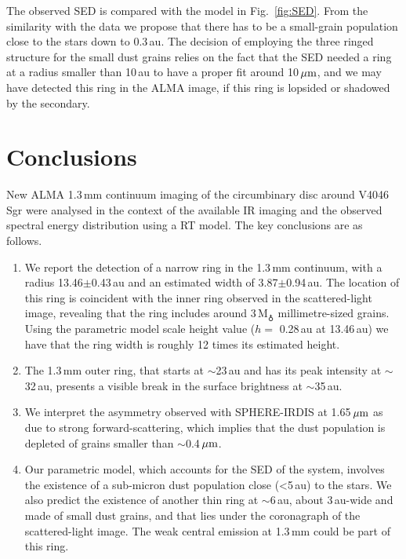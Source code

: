 \documentclass[letters,usenatbib,times]{mnras}
\begin{document}
The observed SED is compared with the model in Fig.~\ref{fig:SED}. From the similarity with the data we propose that there has to be a small-grain population close to the stars down to 0.3\,au. The decision of employing the three ringed structure for the small dust grains relies on the fact that the SED needed a ring at a radius smaller than 10\,au to have a proper fit around 10\,$\hbox{$\mu$m}$, and we may have detected this ring in the ALMA image, if this ring is lopsided or shadowed by the secondary. 


\section{Conclusions} \label{sec:Conclusions}

New ALMA 1.3\,mm continuum imaging of the circumbinary disc around V4046\,Sgr were analysed in the context of the available IR imaging and the observed spectral energy distribution using a RT model. The key conclusions are as follows.
\begin{enumerate}
  \item We report the detection of a narrow ring in the 1.3\,mm continuum, with a radius 13.46$\pm$0.43\,au and an estimated width of 3.87$\pm$0.94\,au. The location of this ring is coincident with the inner ring observed in the scattered-light image, revealing that the ring includes around 3\,M$_{\earth}$ millimetre-sized grains. Using the parametric model scale height value ($h= $ 0.28\,au at 13.46\,au) we have that the ring width is roughly 12 times its estimated height.
  
  \item The 1.3\,mm outer ring, that starts at $\sim$23\,au and has its peak intensity at $\sim$32\,au, presents a visible break in the surface brightness at $\sim$35\,au. 
  
  \item We interpret the asymmetry observed with SPHERE-IRDIS at 1.65\,$\hbox{$\mu$m}$ as due to strong forward-scattering, which implies that the dust population is depleted of grains smaller than $\sim$0.4\,$\hbox{$\mu$m}$.
  
  \item Our parametric model, which accounts for the SED of the system, involves the existence of a sub-micron dust population close (<5\,au) to the stars. We also predict the existence of another thin ring at $\sim$6\,au, about 3\,au-wide and made of small dust grains, and that lies under the coronagraph of the scattered-light image. The weak central emission at 1.3\,mm could be part of this ring.
\end{enumerate}
\end{document}
